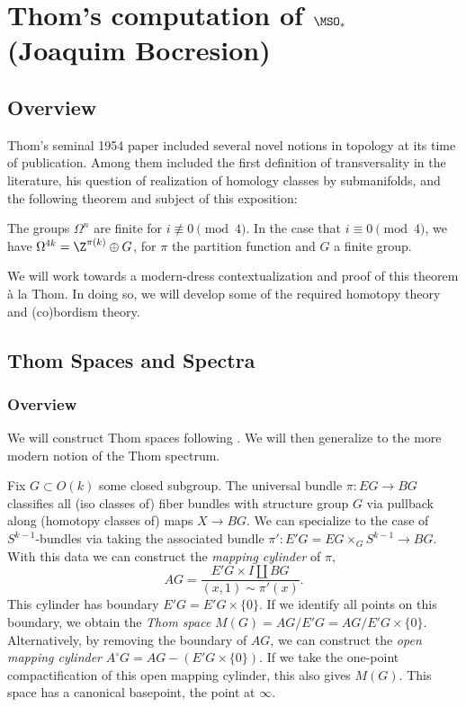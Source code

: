 % 


\section{Thom's computation of $\MSO_\ast$ (Joaquim Bocresion)}
\subsection{Overview}
Thom's seminal 1954 paper included several novel notions in topology at its time of publication. Among them included the first definition of transversality in the literature, his question of realization of homology classes by submanifolds, and the following theorem and subject of this exposition:
\begin{theorem}
The groups $\Omega^n$ are finite for $i\not\equiv 0\pmod 4$. In the case that $i\equiv 0\pmod 4$, we have $\Omega^{4k}=\Z^{\pi(k)}\oplus G$, for $\pi$ the partition function and $G$ a finite group.
\end{theorem}
We will work towards a modern-dress contextualization and proof of this theorem \`a la Thom. In doing so, we will develop some of the required homotopy theory and (co)bordism theory. 



\subsection{Thom Spaces and Spectra}
\subsubsection{Overview}
We will construct Thom spaces following \cite{thom}. We will then generalize to the more modern notion of the Thom spectrum. 

Fix $G\subset O(k)$ some closed subgroup. The universal bundle $\pi: EG\to BG$ classifies all (iso classes of) fiber bundles with structure group $G$ via pullback along (homotopy classes of) maps $X\to BG$. We can specialize to the case of $S^{k-1}$-bundles via taking the associated bundle $\pi':E'G=EG\times_G S^{k-1}\to BG$. With this data we can construct the \textit{mapping cylinder} of $\pi$,
\[
AG=\frac{E'G\times I\coprod BG}{(x,1)\sim \pi'(x)}.
\]
This cylinder has boundary $E'G=E'G\times \{0\}$. If we identify all points on this boundary, we obtain the \textit{Thom space} $M(G)=AG/E'G=AG/E'G\times\{0\}$. Alternatively, by removing the boundary of $AG$, we can construct the \textit{open mapping cylinder} $A^\circ G=AG-(E'G\times\{0\})$. If we take the one-point compactification of this open mapping cylinder, this also gives $M(G)$. This space has a canonical basepoint, the point at $\infty$. 

